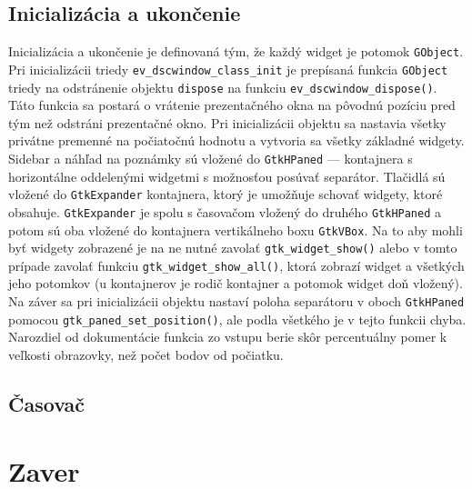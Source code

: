 \documentclass[12pt,oneside,final]{fithesis2}
\begin{document}
\section{Inicializácia a ukončenie}
Inicializácia a ukončenie je definovaná tým, že každý widget je potomok \texttt{GObject}. Pri inicializácii triedy \texttt{ev\_dscwindow\_class\_init} je prepísaná funkcia \texttt{GObject} triedy na odstránenie objektu \texttt{dispose} na funkciu \texttt{ev\_dscwindow\_dispose()}. Táto funkcia sa postará o vrátenie prezentačného okna na pôvodnú pozíciu pred tým než odstráni prezentačné okno. Pri inicializácii objektu sa nastavia všetky privátne premenné na počiatočnú hodnotu a vytvoria sa všetky základné widgety. Sidebar a náhľad na poznámky sú vložené do \texttt{GtkHPaned} --- kontajnera s horizontálne oddelenými widgetmi s možnosťou posúvať separátor. Tlačidlá sú vložené do \texttt{GtkExpander} kontajnera, ktorý je umožňuje schovať widgety, ktoré obsahuje. \texttt{GtkExpander} je spolu s časovačom vložený do druhého \texttt{GtkHPaned} a potom sú oba vložené do kontajnera vertikálneho boxu \texttt{GtkVBox}. Na to aby mohli byť widgety zobrazené je na ne nutné zavolať \texttt{gtk\_widget\_show()} alebo v tomto prípade zavolať funkciu \texttt{gtk\_widget\_show\_all()}, ktorá zobrazí widget a všetkých jeho potomkov (u kontajnerov je rodič kontajner a potomok widget doň vložený). Na záver sa pri inicializácii objektu nastaví poloha separátoru v oboch \texttt{GtkHPaned} pomocou \texttt{gtk\_paned\_set\_position()}, ale podla všetkého je v tejto funkcii chyba. Narozdiel od dokumentácie funkcia zo vstupu berie skôr percentuálny pomer k veľkosti obrazovky, než počet bodov od počiatku.
\section{Časovač}

\chapter{Zaver}
\raggedright


\end{document}

